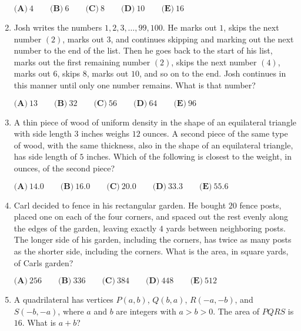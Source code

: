 \documentclass{article}
\begin{document}
\begin{enumerate}[label=\arabic*., itemsep=0.5em]
\(\textbf{(A)}\ 4\qquad\textbf{(B)}\ 6\qquad\textbf{(C)}\ 8\qquad\textbf{(D)}\ 10\qquad\textbf{(E)}\ 16\)\par \vspace{0.5em}\item Josh writes the numbers \(1,2,3,\dots,99,100\). He marks out \(1\), skips the next number \((2)\), marks out \(3\), and continues skipping and marking out the next number to the end of the list. Then he goes back to the start of his list, marks out the first remaining number \((2)\), skips the next number \((4)\), marks out \(6\), skips \(8\), marks out \(10\), and so on to the end. Josh continues in this manner until only one number remains. What is that number?

\(\textbf{(A)}\ 13 \qquad
\textbf{(B)}\ 32 \qquad
\textbf{(C)}\ 56 \qquad
\textbf{(D)}\ 64 \qquad
\textbf{(E)}\ 96\)\par \vspace{0.5em}\item A thin piece of wood of uniform density in the shape of an equilateral triangle with side length \(3\) inches weighs \(12\) ounces. A second piece of the same type of wood, with the same thickness, also in the shape of an equilateral triangle, has side length of \(5\) inches. Which of the following is closest to the weight, in ounces, of the second piece?

\(\textbf{(A)}\ 14.0\qquad\textbf{(B)}\ 16.0\qquad\textbf{(C)}\ 20.0\qquad\textbf{(D)}\ 33.3\qquad\textbf{(E)}\ 55.6\)\par \vspace{0.5em}\item Carl decided to fence in his rectangular garden. He bought \(20\) fence posts, placed one on each of the four corners, and spaced out the rest evenly along the edges of the garden, leaving exactly \(4\) yards between neighboring posts. The longer side of his garden, including the corners, has twice as many posts as the shorter side, including the corners. What is the area, in square yards, of Carls garden?

\(\textbf{(A)}\ 256\qquad\textbf{(B)}\ 336\qquad\textbf{(C)}\ 384\qquad\textbf{(D)}\ 448\qquad\textbf{(E)}\ 512\)\par \vspace{0.5em}\item A quadrilateral has vertices \(P(a,b)\), \(Q(b,a)\), \(R(-a, -b)\), and \(S(-b, -a)\), where \(a\) and \(b\) are integers with \(a>b>0\). The area of \(PQRS\) is \(16\). What is \(a+b\)?


\end{enumerate}
\end{document}
